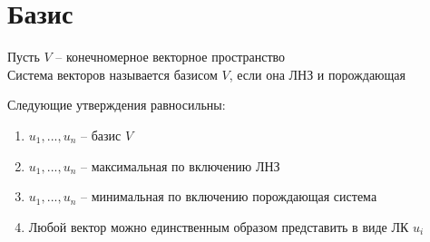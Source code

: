 \section{Базис}

\begin{definition}
	Пусть $V$ -- конечномерное векторное пространство \\
    Система векторов называется базисом $V$, если она ЛНЗ и порождающая
\end{definition}

\begin{theorem}
	Следующие утверждения равносильны:
    \begin{enumerate}
    	\item $u_1, ..., u_n$ -- базис $V$
        \item $u_1, ..., u_n$ -- максимальная по включению ЛНЗ
        \item $u_1, ..., u_n$ -- минимальная по включению порождающая система
        \item Любой вектор можно единственным образом представить в виде ЛК $u_i$
    \end{enumerate}
\end{theorem}
